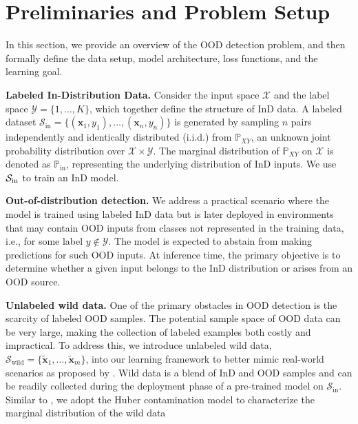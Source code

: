 \documentclass[10pt]{article} %
\theoremstyle{plain}
\theoremstyle{definition}
\begin{document}
\section{Preliminaries and Problem Setup}
In this section, we provide an overview of the OOD detection problem, and then formally define the data setup, model architecture, loss functions, and the learning goal.

\textbf{Labeled In-Distribution Data.}
Consider the input space $\mathcal{X}$ and the label space $\mathcal{Y} = \{1, \dots, K\}$, which together define the structure of InD data. 
A labeled dataset $\mathcal{S}_{\text{in}} = \{(\bm{x}_1, y_1), \dots, (\bm{x}_n, y_n)\} $ is generated by sampling $n$ pairs independently and identically distributed (i.i.d.) from $\mathbb{P}_{{XY}}$, an unknown joint probability distribution over $\mathcal{X} \times \mathcal{Y}$. The marginal distribution of $\mathbb{P}_{{XY}}$ on $\mathcal{X}$ is denoted as $\mathbb{P}_{\text{in}}$, representing the underlying distribution of InD inputs. We use $\mathcal{S}_{\rm in}$ to train an InD model.


\textbf{Out-of-distribution detection.} 
We address a practical scenario where the model is trained using labeled InD data but is later deployed in environments that may contain OOD inputs from classes not represented in the training data, i.e., for some label \(y \notin \mathcal{Y}\). The model is expected to abstain from making predictions for such OOD inputs. At inference time, the primary objective is to determine whether a given input belongs to the InD distribution or arises from an OOD source.





\textbf{Unlabeled wild data.} One of the primary obstacles in OOD detection is the scarcity of labeled OOD samples. The potential sample space of OOD data can be very large, making the collection of labeled examples both costly and impractical. To address this, we introduce unlabeled wild data, $\mathcal{S}_{\text{wild}} = \{\bm{\tilde{x}}_1, \dots, \bm{\tilde{x}}_m\}$, into our learning framework to better mimic real-world scenarios as proposed by \citet{pmlr-v162-katz-samuels22a}. Wild data is a blend of InD and OOD samples and can be readily collected during the deployment phase of a pre-trained model on $\mathcal{S}_{\text{in}}$.  
Similar to \citet{du2024how, pmlr-v162-katz-samuels22a}, we adopt the Huber contamination model \citep{huber1964robust} to characterize the marginal distribution of the wild data
\end{document}
